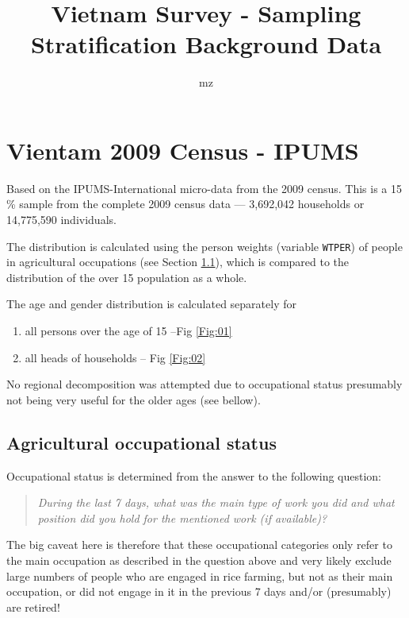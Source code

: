 \documentclass{article}
\begin{document}
\title{Vietnam Survey - Sampling Stratification Background Data}
\author{mz}
\maketitle
\normalsize


\section{Vientam 2009 Census - IPUMS}

Based on the IPUMS-International micro-data from the 2009 census. This is a 15 \% sample from the complete 2009 census data --- 3,692,042 households or 14,775,590 individuals. 

\bigskip

\noindent The distribution is calculated using the person weights (variable \texttt{WTPER}) of people in agricultural occupations (see Section \ref{Sec:agr}), which is compared to the distribution of the over 15 population as a whole. 



\bigskip

\noindent The age and gender distribution is calculated separately for
\begin{enumerate}
\item all persons over the age of 15 --Fig \ref{Fig:01}
\item all heads of households -- Fig \ref{Fig:02}
\end{enumerate}

No regional decomposition was attempted due to occupational status presumably not being very useful for the older ages (see bellow). 

\subsection{Agricultural occupational status}\label{Sec:agr}

Occupational status is determined from the answer to the following question:

\begin{quote}
\emph{During the last 7 days, what was the main type of work you did and what position did you hold for the mentioned work (if available)?}
\end{quote}

\noindent The big caveat here is therefore that these occupational categories only refer to the main occupation as described in the question above and very likely exclude large numbers of people who are engaged in rice farming, but not as their main occupation, or did not engage in it in the previous 7 days and/or (presumably) are retired!
\end{document}
